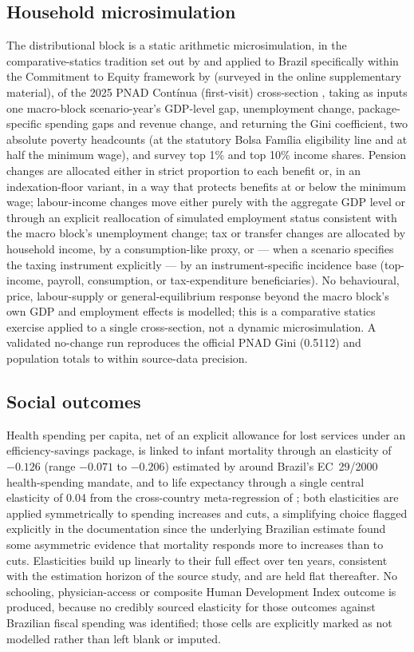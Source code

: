 \documentclass[11pt,a4paper]{article}
\begin{document}
\subsection{Household microsimulation}

The distributional block is a static arithmetic microsimulation, in the comparative-statics tradition set out by \citet{bourguignonspadaro2006} and applied to Brazil specifically within the Commitment to Equity framework by \citet{higginspereira2014} (surveyed in the online supplementary material), of the 2025 PNAD Cont\'inua (first-visit) cross-section \citep{pnad2025}, taking as inputs one macro-block scenario-year's GDP-level gap, unemployment change, package-specific spending gaps and revenue change, and returning the Gini coefficient, two absolute poverty headcounts (at the statutory Bolsa Fam\'ilia eligibility line and at half the minimum wage), and survey top 1\% and top 10\% income shares. Pension changes are allocated either in strict proportion to each benefit or, in an indexation-floor variant, in a way that protects benefits at or below the minimum wage; labour-income changes move either purely with the aggregate GDP level or through an explicit reallocation of simulated employment status consistent with the macro block's unemployment change; tax or transfer changes are allocated by household income, by a consumption-like proxy, or --- when a scenario specifies the taxing instrument explicitly --- by an instrument-specific incidence base (top-income, payroll, consumption, or tax-expenditure beneficiaries). No behavioural, price, labour-supply or general-equilibrium response beyond the macro block's own GDP and employment effects is modelled; this is a comparative statics exercise applied to a single cross-section, not a dynamic microsimulation. A validated no-change run reproduces the official PNAD Gini (0.5112) and population totals to within source-data precision.

\subsection{Social outcomes}

Health spending per capita, net of an explicit allowance for lost services under an efficiency-savings package, is linked to infant mortality through an elasticity of $-0.126$ (range $-0.071$ to $-0.206$) estimated by \citet{szkloclarkerocha2024} around Brazil's EC~29/2000 health-spending mandate, and to life expectancy through a single central elasticity of 0.04 from the cross-country meta-regression of \citet{gallet2017}; both elasticities are applied symmetrically to spending increases and cuts, a simplifying choice flagged explicitly in the documentation since the underlying Brazilian estimate found some asymmetric evidence that mortality responds more to increases than to cuts. Elasticities build up linearly to their full effect over ten years, consistent with the estimation horizon of the source study, and are held flat thereafter. No schooling, physician-access or composite Human Development Index outcome is produced, because no credibly sourced elasticity for those outcomes against Brazilian fiscal spending was identified; those cells are explicitly marked as not modelled rather than left blank or imputed.
\end{document}
